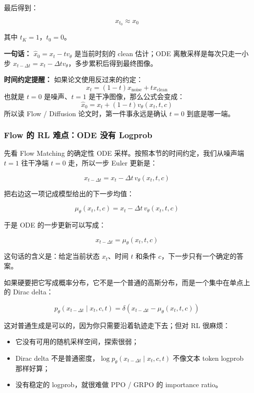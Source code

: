 最后得到：

\[
x_{t_0}\approx x_0
\]

其中 $t_K=1$，$t_0=0$。

\begin{summarybox}
\textbf{一句话：} $\hat{x}_0=x_t-t v_\theta$ 是当前时刻的 clean 估计；ODE 离散采样是每次只走一小步 $x_{t-\Delta t}=x_t-\Delta t v_\theta$，多步累积后得到最终图像。
\end{summarybox}

\begin{warnbox}
\textbf{时间约定提醒：} 如果论文使用反过来的约定：
\[
x_t=(1-t)x_\text{noise}+t x_\text{clean}
\]
也就是 $t=0$ 是噪声、$t=1$ 是干净图像，那么公式会变成：
\[
\hat{x}_0 = x_t + (1-t)v_\theta(x_t,t,c)
\]
所以读 Flow / Diffusion 论文时，第一件事永远是确认 $t=0$ 到底是哪一端。
\end{warnbox}

\subsubsection{Flow 的 RL 难点：ODE 没有 Logprob}

先看 Flow Matching 的确定性 ODE 采样。按照本节的时间约定，我们从噪声端 $t=1$ 往干净端 $t=0$ 走，所以一步 Euler 更新是：

\[
x_{t-\Delta t}
=
x_t
-
\Delta t\,v_\theta(x_t,t,c)
\]

把右边这一项记成模型给出的下一步均值：

\[
\mu_\theta(x_t,t,c)
=
x_t
-
\Delta t\,v_\theta(x_t,t,c)
\]

于是 ODE 的一步更新可以写成：

\[
x_{t-\Delta t}
=
\mu_\theta(x_t,t,c)
\]

这句话的含义是：给定当前状态 $x_t$、时间 $t$ 和条件 $c$，下一步只有一个确定的答案。

如果硬要把它写成概率分布，它不是一个普通的高斯分布，而是一个集中在单点上的 Dirac delta：

\[
p_\theta(x_{t-\Delta t}\mid x_t,c,t)
=
\delta
\left(
x_{t-\Delta t}
-
\mu_\theta(x_t,t,c)
\right)
\]

这对普通生成是可以的，因为你只需要沿着轨迹走下去；但对 RL 很麻烦：

\begin{itemize}[leftmargin=1.5em]
  \item 它没有可用的随机采样空间，探索很弱；
  \item Dirac delta 不是普通密度，$\log p_\theta(x_{t-\Delta t}\mid x_t,c,t)$ 不像文本 token logprob 那样好算；
  \item 没有稳定的 logprob，就很难做 PPO / GRPO 的 importance ratio。
\end{itemize}

